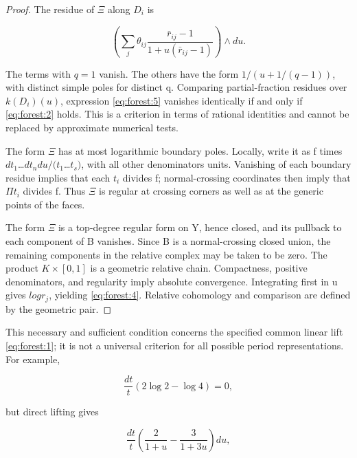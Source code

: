 \documentclass[11pt,a4paper,oneside]{article}
\theoremstyle{plain}
\theoremstyle{definition}
\theoremstyle{remark}
\numberwithin{equation}{section}
\begin{document}
\begin{proof}

The residue of \(\Xi \) along \(D_i\) is

\begin{equation}
\left(\sum_j\theta_{ij}
       \frac{\bar r_{ij}-1}{1+u(\bar r_{ij}-1)}\right)\wedge du.   \label{eq:forest:5}
\end{equation}

The terms with \(q=1\) vanish. The others have the form \(1/(u+1/(q- 1))\), with distinct simple poles for distinct q. Comparing partial-fraction residues over \(k(D_i)(u)\), expression \eqref{eq:forest:5} vanishes identically if and only if \eqref{eq:forest:2} holds. This is a criterion in terms of rational identities and cannot be replaced by approximate numerical tests.

The form \(\Xi \) has at most logarithmic boundary poles. Locally, write it as f times \(dt_1\)\ldots{}\(dt_n du/(t_1\)\ldots{}\(t_s)\), with all other denominators units. Vanishing of each boundary residue implies that each \(t_i\) divides f; normal-crossing coordinates then imply that \(\Pi t_i\) divides f. Thus \(\Xi \) is regular at crossing corners as well as at the generic points of the faces.

The form \(\Xi \) is a top-degree regular form on Y, hence closed, and its pullback to each component of B vanishes. Since B is a normal-crossing closed union, the remaining components in the relative complex may be taken to be zero. The product \(K\times [0,1]\) is a geometric relative chain. Compactness, positive denominators, and regularity imply absolute convergence. Integrating first in u gives \(log r_j\), yielding \eqref{eq:forest:4}. Relative cohomology and comparison are defined by the geometric pair.

\end{proof}

This necessary and sufficient condition concerns the specified common linear lift \eqref{eq:forest:1}; it is not a universal criterion for all possible period representations. For example,

\begin{equation}
\frac{dt}{t}(2\log2-\log4)=0,
\end{equation}

but direct lifting gives

\begin{equation}
\frac{dt}{t}
 \left(\frac2{1+u}-\frac3{1+3u}\right)du,                        \label{eq:forest:6}
\end{equation}
\end{document}
